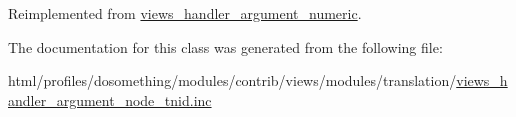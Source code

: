Reimplemented from \hyperlink{classviews__handler__argument__numeric_a5c6f566b06bad6057e92f15d82311c7b}{views\_\-handler\_\-argument\_\-numeric}.

The documentation for this class was generated from the following file:\begin{DoxyCompactItemize}
\item 
html/profiles/dosomething/modules/contrib/views/modules/translation/\hyperlink{views__handler__argument__node__tnid_8inc}{views\_\-handler\_\-argument\_\-node\_\-tnid.inc}\end{DoxyCompactItemize}
